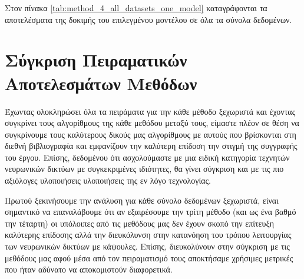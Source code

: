Στον πίνακα \ref{tab:method_4_all_datasets_one_model} καταγράφονται τα αποτελέσματα της δοκιμής του επιλεγμένου μοντέλου σε όλα τα σύνολα δεδομένων.
\begin{table}[h]
    \begin{center}
    \end{center}
    \caption[]{\label{tab:method_4_all_datasets_one_model}Συνολικά αποτελέσματα δοκιμής του μοντέλου ... σε όλα τα σύνολα δεδομένων που υποστηρίζει η τέταρτη μέθοδος.} 
\end{table}

\section{Σύγκριση Πειραματικών Αποτελεσμάτων Μεθόδων}
Έχωντας ολοκληρώσει όλα τα πειράματα για την κάθε μέθοδο ξεχωριστά και έχοντας συγκρίνει τους αλγορίθμους της κάθε μεθόδου μεταξύ τους, είμαστε πλέον σε θέση να συγκρίνουμε τους καλύτερους δικούς μας αλγορίθμους με αυτούς που βρίσκονται στη διεθνή βιβλιογραφία και εμφανίζουν την καλύτερη επίδοση την στιγμή της συγγραφής του έργου. Επίσης, δεδομένου ότι ασχολούμαστε με μια ειδική κατηγορία τεχνητών νευρωνικών δικτύων με συγκεκριμένες ιδιότητες, θα γίνει σύγκριση και με τις πιο αξιόλογες υλοποιήσεις υλοποιήσεις της εν λόγο τεχνολογίας.\par

Πρωτού ξεκινήσουμε την ανάλυση για κάθε σύνολο δεδομένων ξεχωριστά, είναι σημαντικό να επαναλάβουμε ότι αν εξαιρέσουμε την τρίτη μέθοδο (και ως ένα βαθμό την τέταρτη) οι υπόλοιπες από τις μεθόδους μας δεν έχουν σκοπό την επίτευξη καλύτερης επίδοσης αλλά την διευκόλυνση στην κατανόηση του τρόπου λειτουργίας των νευρωνικών δικτύων με κάψουλες. Επίσης, διευκολύνουν στην σύγκριση με τις μεθόδους μας αφού μέσα από τον πειραματισμό τους αποκτήσαμε χρήσιμες μετρικές που ήταν αδύνατο να αποκομιστούν διαφορετικά.\par

